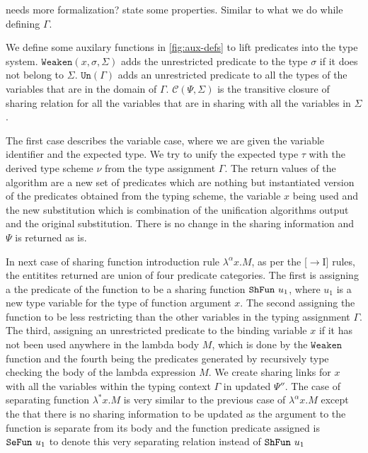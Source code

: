 {\color{red} needs more formalization? state some
properties. Similar to what we do while defining $\Gamma$}.

We define some auxilary functions in \cref{fig:aux-defs} to lift predicates into the type system.
$\texttt{Weaken}(x, \sigma, \Sigma)$ adds the unrestricted predicate to the type $\sigma$
if it does not belong to $\Sigma$. $\texttt{Un}(\Gamma)$ adds an unrestricted
predicate to all the types of the variables that are in the domain of $\Gamma$. $\mathcal{C}(\Psi, \Sigma)$ is the transitive
closure of sharing relation for all the variables that are in sharing with all the variables in $\Sigma$.

The first case describes the variable case, where we are given the variable identifier and
the expected type. We try to unify the expected type $\tau$ with the derived type scheme
$\nu$ from the type assignment $\Gamma$. The return values of the algorithm are
a new set of predicates which are nothing but instantiated version of the predicates
obtained from the typing scheme, the variable $x$ being used and the new
substitution which is combination of the unification algorithms output and the original
substitution. There is no change in the sharing information and $\Psi$ is returned as is.

In next case of sharing function introduction rule $\lambda^{\alpha}x.M$, as per the [$\rightarrow$I] rules, the entitites returned
are union of four predicate categories. The first is assigning a the predicate of the function to be
a sharing function $\texttt{ShFun}\ u_1$, where $u_1$ is a new type variable for the type of function argument $x$.
The second assigning the function to be less restricting than the other variables in the typing assignment $\Gamma$.
The third, assigning an unrestricted predicate to the binding variable $x$ if it has not been used
anywhere in the lambda body $M$, which is done by the $\texttt{Weaken}$ function and the fourth
being the predicates generated by recursively type checking the body of the lambda expression $M$.
We create sharing links for $x$ with all the variables within the typing context $\Gamma$ in updated
$\Psi''$.
The case of separating function $\lambda^{*}x. M$ is very similar to the previous case of $\lambda^{\alpha}x. M$ except
the that there is no sharing information to be updated as the argument to the function is
separate from its body and the function predicate assigned is $\texttt{SeFun}\ u_1$ to denote this very
separating relation instead of $\texttt{ShFun}\ u_1$

